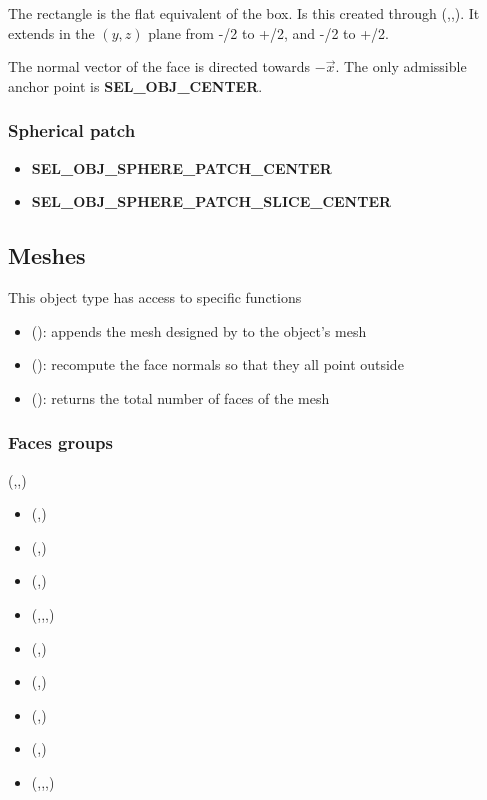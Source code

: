 The rectangle is the flat equivalent of the box. Is this created through (,,). It extends in the $(y,z)$ plane from -/2 to +/2, and -/2 to +/2.

The normal vector of the face is directed towards $-\vec x$. The only admissible anchor point is \textbf{SEL\_OBJ\_CENTER}.

\newpage
\subsubsection{Spherical patch}

\begin{itemize}
	\item \textbf{SEL\_OBJ\_SPHERE\_PATCH\_CENTER}
	\item \textbf{SEL\_OBJ\_SPHERE\_PATCH\_SLICE\_CENTER}
\end{itemize}

\subsection{Meshes}

This object type has access to specific functions
\begin{itemize}
	\item {}(): appends the mesh designed by  to the object's mesh
	\item {}(): recompute the face normals so that they all point outside
	\item {}(): returns the total number of faces of the mesh
\end{itemize}

\subsubsection{Faces groups}

(,,)

\begin{itemize}
	\item {}(,)
	\item {}(,)
	\item {}(,)
	\item {}(,,,)
	\item {}(,)
	\item {}(,)
	\item {}(,)
	\item {}(,)
	\item {}(,,,)
\end{itemize}

